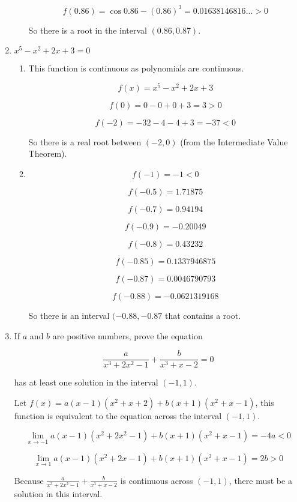 \documentclass{article}
\begin{document}
\begin{enumerate}
\begin{enumerate}
				$$f(0.86) = \cos 0.86 - (0.86)^3 = 0.01638146816... > 0$$

				So there is a root in the interval $(0.86,0.87)$.
			\end{enumerate}

			\item $x^5 - x^2 + 2x + 3 = 0$

			\begin{enumerate}
				\item

				This function is continuous as polynomials are continuous.

				$$f(x) = x^5 - x^2 + 2x + 3$$

				$$f(0) = 0 - 0 + 0 + 3 = 3 > 0$$

				$$f(-2) = -32 - 4 - 4 + 3 = -37 < 0$$

				So there is a real root between $(-2, 0)$ (from the Intermediate Value
				Theorem).	

				\item

				$$f(-1) = -1 < 0$$

				$$f(-0.5) = 1.71875$$

				$$f(-0.7) = 0.94194$$

				$$f(-0.9) = -0.20049$$

				$$f(-0.8) = 0.43232$$

				$$f(-0.85) = 0.1337946875$$

				$$f(-0.87) = 0.0046790793$$

				$$f(-0.88) = -0.0621319168$$

				So there is an interval $(-0.88, -0.87$ that contains a root.
			\end{enumerate}

			\item If $a$ and $b$ are positive numbers, prove the equation

				$$\frac{a}{x^3+2x^2-1} + \frac{b}{x^3+x-2} = 0$$

				has at least one solution in the interval $(-1,1)$.

				Let $f(x) = a(x-1)(x^2+x+2) + b(x+1)(x^2+x-1)$, this function is
				equivalent to the equation across the interval $(-1,1)$.

				$$\lim \limits _{x \to -1} a(x-1)(x^2+2x^2-1) + b(x+1)(x^2+x-1) = -4a < 0$$

				$$\lim \limits _{x \to 1} a(x-1)(x^2+2x-1) + b(x+1)(x^2+x-1) = 2b > 0$$


				Because $\frac{a}{x^3+2x^2-1} + \frac{b}{x^3+x-2}$ is continuous across $(-1,1)$,
				there must be a solution in this interval.


\end{enumerate}
\end{document}
